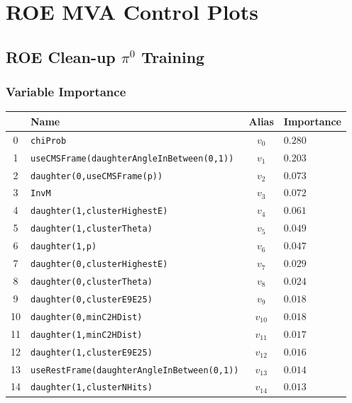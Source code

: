 \chapter{ROE MVA Control Plots}\label{sec:roe-control-plots}
\section{ROE Clean-up \texorpdfstring{$\pi^0$}{π0} Training}\label{sec:ROE_pi0}

\subsection{Variable Importance}

\begin{longtable}{c|l|c|l}
& Name & Alias & Importance \\
\toprule 
0 &\texttt{\footnotesize chiProb} & $v_{0}$ & $0.280$ \\ 
1 &\texttt{\footnotesize useCMSFrame(daughterAngleInBetween(0,1))} & $v_{1}$ & $0.203$ \\ 
2 &\texttt{\footnotesize daughter(0,useCMSFrame(p))} & $v_{2}$ & $0.073$ \\ 
3 &\texttt{\footnotesize InvM} & $v_{3}$ & $0.072$ \\ 
4 &\texttt{\footnotesize daughter(1,clusterHighestE)} & $v_{4}$ & $0.061$ \\ 
5 &\texttt{\footnotesize daughter(1,clusterTheta)} & $v_{5}$ & $0.049$ \\ 
6 &\texttt{\footnotesize daughter(1,p)} & $v_{6}$ & $0.047$ \\ 
7 &\texttt{\footnotesize daughter(0,clusterHighestE)} & $v_{7}$ & $0.029$ \\ 
8 &\texttt{\footnotesize daughter(0,clusterTheta)} & $v_{8}$ & $0.024$ \\ 
9 &\texttt{\footnotesize daughter(0,clusterE9E25)} & $v_{9}$ & $0.018$ \\ 
10 &\texttt{\footnotesize daughter(0,minC2HDist)} & $v_{10}$ & $0.018$ \\ 
11 &\texttt{\footnotesize daughter(1,minC2HDist)} & $v_{11}$ & $0.017$ \\ 
12 &\texttt{\footnotesize daughter(1,clusterE9E25)} & $v_{12}$ & $0.016$ \\ 
13 &\texttt{\footnotesize useRestFrame(daughterAngleInBetween(0,1))} & $v_{13}$ & $0.014$ \\ 
14 &\texttt{\footnotesize daughter(1,clusterNHits)} & $v_{14}$ & $0.013$ \\ 

\end{longtable}
